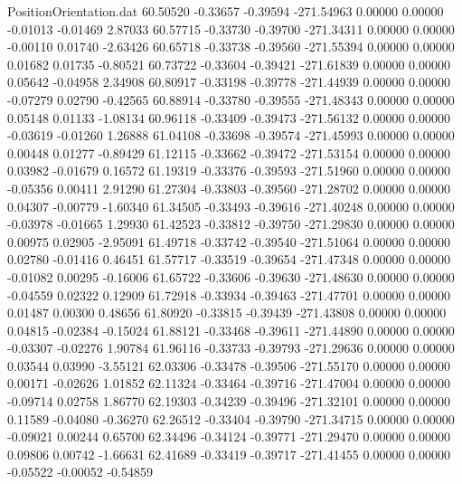 \begin{filecontents}{PositionOrientation.dat}
  60.50520   -0.33657   -0.39594  -271.54963    0.00000    0.00000   -0.01013   -0.01469    2.87033
  60.57715   -0.33730   -0.39700  -271.34311    0.00000    0.00000   -0.00110    0.01740   -2.63426
  60.65718   -0.33738   -0.39560  -271.55394    0.00000    0.00000    0.01682    0.01735   -0.80521
  60.73722   -0.33604   -0.39421  -271.61839    0.00000    0.00000    0.05642   -0.04958    2.34908
  60.80917   -0.33198   -0.39778  -271.44939    0.00000    0.00000   -0.07279    0.02790   -0.42565
  60.88914   -0.33780   -0.39555  -271.48343    0.00000    0.00000    0.05148    0.01133   -1.08134
  60.96118   -0.33409   -0.39473  -271.56132    0.00000    0.00000   -0.03619   -0.01260    1.26888
  61.04108   -0.33698   -0.39574  -271.45993    0.00000    0.00000    0.00448    0.01277   -0.89429
  61.12115   -0.33662   -0.39472  -271.53154    0.00000    0.00000    0.03982   -0.01679    0.16572
  61.19319   -0.33376   -0.39593  -271.51960    0.00000    0.00000   -0.05356    0.00411    2.91290
  61.27304   -0.33803   -0.39560  -271.28702    0.00000    0.00000    0.04307   -0.00779   -1.60340
  61.34505   -0.33493   -0.39616  -271.40248    0.00000    0.00000   -0.03978   -0.01665    1.29930
  61.42523   -0.33812   -0.39750  -271.29830    0.00000    0.00000    0.00975    0.02905   -2.95091
  61.49718   -0.33742   -0.39540  -271.51064    0.00000    0.00000    0.02780   -0.01416    0.46451
  61.57717   -0.33519   -0.39654  -271.47348    0.00000    0.00000   -0.01082    0.00295   -0.16006
  61.65722   -0.33606   -0.39630  -271.48630    0.00000    0.00000   -0.04559    0.02322    0.12909
  61.72918   -0.33934   -0.39463  -271.47701    0.00000    0.00000    0.01487    0.00300    0.48656
  61.80920   -0.33815   -0.39439  -271.43808    0.00000    0.00000    0.04815   -0.02384   -0.15024
  61.88121   -0.33468   -0.39611  -271.44890    0.00000    0.00000   -0.03307   -0.02276    1.90784
  61.96116   -0.33733   -0.39793  -271.29636    0.00000    0.00000    0.03544    0.03990   -3.55121
  62.03306   -0.33478   -0.39506  -271.55170    0.00000    0.00000    0.00171   -0.02626    1.01852
  62.11324   -0.33464   -0.39716  -271.47004    0.00000    0.00000   -0.09714    0.02758    1.86770
  62.19303   -0.34239   -0.39496  -271.32101    0.00000    0.00000    0.11589   -0.04080   -0.36270
  62.26512   -0.33404   -0.39790  -271.34715    0.00000    0.00000   -0.09021    0.00244    0.65700
  62.34496   -0.34124   -0.39771  -271.29470    0.00000    0.00000    0.09806    0.00742   -1.66631
  62.41689   -0.33419   -0.39717  -271.41455    0.00000    0.00000   -0.05522   -0.00052   -0.54859

\end{filecontents}
